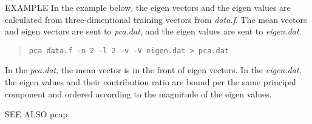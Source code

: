\begin{options}
\end{options}

\begin{qsection}{EXAMPLE}
 In the example below,
 the eigen vectors and the eigen values are
 calculated from three-dimentional training vectors
 from {\em data.f}.
 The mean vectors and eigen vectors are sent to
 {\em pca.dat}, and the eigen values are sent to {\em eigen.dat}.
\begin{quote}
  \verb!pca data.f -n 2 -l 2 -v -V eigen.dat > pca.dat!
\end{quote} 
\end{qsection}
In the {\em pca.dat}, the mean vector is in the front of
eigen vectors.
In the {\em eigen.dat}, 
the eigen values and their contribution ratio are bound per
the same principal component and ordered according to the
magnitude of the eigen values.
\begin{qsection}{SEE ALSO}
 pcap
\end{qsection}

